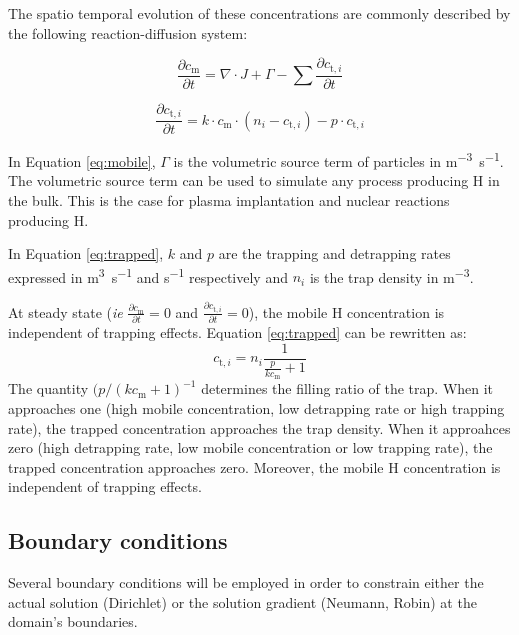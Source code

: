 The spatio temporal evolution of these concentrations are commonly described by the following reaction-diffusion system:

\begin{equation}
    \frac{\partial c_\mathrm{m}}{\partial t}=\nabla \cdot J+\Gamma-\sum \frac{\partial c_{\mathrm{t}, i}}{\partial t}
    \label{eq:mobile}
\end{equation}

\begin{equation}
    \frac{\partial c_{\mathrm{t}, i}}{\partial t}=k \cdot c_\mathrm{m} \cdot\left(n_{i}-c_{\mathrm{t}, i}\right)-p \cdot c_{\mathrm{t}, i}
    \label{eq:trapped}
\end{equation}

In Equation \ref{eq:mobile}, $\Gamma$ is the volumetric source term of particles in \si{m^{-3}.s^{-1}}.
The volumetric source term can be used to simulate any process producing H in the bulk.
This is the case for plasma implantation and nuclear reactions producing H.

In Equation \ref{eq:trapped}, $k$ and $p$ are the trapping and detrapping rates expressed in \si{m^3.s^{-1}} and \si{s^{-1}} respectively and $n_i$ is the trap density in \si{m^{-3}}.

At steady state (\textit{ie} $\frac{\partial c_\mathrm{m}}{\partial t} = 0$ and $\frac{\partial c_{\mathrm{t}, i}}{\partial t} = 0$), the mobile H concentration is independent of trapping effects.
Equation \ref{eq:trapped} can be rewritten as:
\begin{equation}
    c_{\mathrm{t}, i} = n_i \frac{1}{\frac{p}{k c_\mathrm{m}} + 1}
    \label{eq: steady state ct}
\end{equation}
The quantity $(p / (k c_\mathrm{m} + 1)^{-1}$ determines the filling ratio of the trap. 
When it approaches one (high mobile concentration, low detrapping rate or high trapping rate), the trapped concentration approaches the trap density.
When it approahces zero (high detrapping rate, low mobile concentration or low trapping rate), the trapped concentration approaches zero.
Moreover, the mobile H concentration is independent of trapping effects.

\subsection{Boundary conditions}

Several boundary conditions will be employed in order to constrain either the actual solution (Dirichlet) or the solution gradient (Neumann, Robin) at the domain's boundaries.

